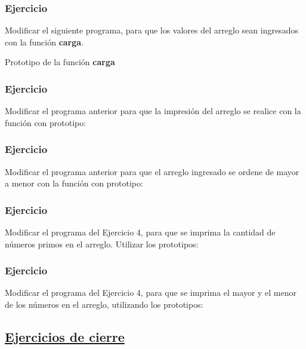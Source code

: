 {\scriptsize
  \lstset{inputencoding=utf8/latin1}
  
}

\subsubsection{Ejercicio}
Modificar el siguiente programa, para que los valores del arreglo sean ingresados con la función \textbf{carga}.
\lstset{inputencoding=utf8/latin1}

Prototipo de la función \textbf{carga}
\lstset{inputencoding=utf8/latin1}


\subsubsection{Ejercicio}
Modificar el programa anterior para que la impresión del arreglo se realice con la función con prototipo:
\lstset{inputencoding=utf8/latin1}


\subsubsection{Ejercicio}
Modificar el programa anterior para que el arreglo ingresado se ordene de mayor a menor con la función con prototipo:
\lstset{inputencoding=utf8/latin1}


\subsubsection{Ejercicio}
Modificar el programa del Ejercicio 4, para que se imprima la cantidad de números primos en el arreglo. Utilizar los prototipos:
\lstset{inputencoding=utf8/latin1}


\subsubsection{Ejercicio}
Modificar el programa del Ejercicio 4, para que se imprima el mayor y el menor de los números en el arreglo, utilizando los prototipos:
\lstset{inputencoding=utf8/latin1}



\subsection*{\underline{Ejercicios de cierre}}

